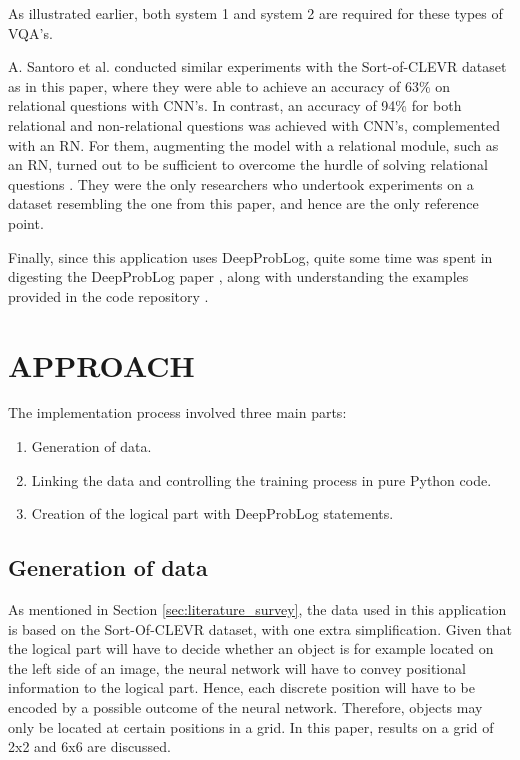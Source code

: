 \documentclass[english]{sobraep}
\begin{document}
As illustrated earlier, both system 1 and system 2 are required for these types of VQA's.

A. Santoro et al. conducted similar experiments with the Sort-of-CLEVR dataset as in this paper, where they were able to achieve an accuracy of 63\% on relational questions with CNN's. In contrast, an accuracy of 94\% for both relational and non-relational questions was achieved with CNN's, complemented with an RN. For them, augmenting the model with a relational module, such as an RN, turned out to be sufficient to overcome the hurdle of solving relational questions \cite{sort_of_clevr_dataset}. They were the only researchers who undertook experiments on a dataset resembling the one from this paper, and hence are the only reference point.

Finally, since this application uses DeepProbLog, quite some time was spent in digesting the DeepProbLog paper \cite{deepproblog}, along with understanding the  examples provided in the code repository \cite{deepproblog_code}.

\section{APPROACH}
\label{sec:approach}
The implementation process involved three main parts:
\begin{enumerate}
    \item Generation of data.
    \item Linking the data and controlling the training process in pure Python code.
    \item Creation of the logical part with DeepProbLog statements.
\end{enumerate}

\subsection{Generation of data}
As mentioned in Section \ref{sec:literature_survey}, the data used in this application is based on the Sort-Of-CLEVR dataset, with one extra simplification. Given that the logical part will have to decide whether an object is for example located on the left side of an image, the neural network will have to convey positional information to the logical part. Hence, each discrete position will have to be encoded by a possible outcome of the neural network. Therefore, objects may only be located at certain positions in a grid. In this paper, results on a grid of 2x2 and 6x6 are discussed.
\end{document}
